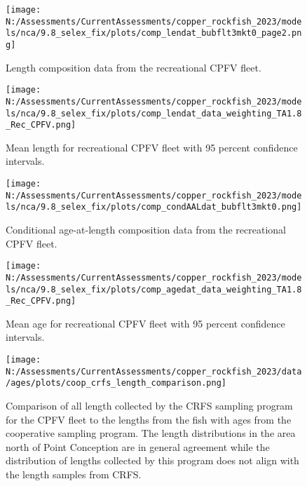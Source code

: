 \documentclass[11pt,
  english,
  letterpaper,
]{article}
\begin{document}
\begin{figure}
\centering
\texttt{[image: N:/Assessments/CurrentAssessments/copper\_rockfish\_2023/models/nca/9.8\_selex\_fix/plots/comp\_lendat\_bubflt3mkt0\_page2.png]}
\caption{Length composition data from the recreational CPFV fleet.\label{fig:rec-cpfv-len-data}}
\end{figure}

\pagebreak

\begin{figure}
\centering
\texttt{[image: N:/Assessments/CurrentAssessments/copper\_rockfish\_2023/models/nca/9.8\_selex\_fix/plots/comp\_lendat\_data\_weighting\_TA1.8\_Rec\_CPFV.png]}
\caption{Mean length for recreational CPFV fleet with 95 percent confidence intervals.\label{fig:mean-rec-cpfv-len-data}}
\end{figure}

\pagebreak

\begin{figure}
\centering
\texttt{[image: N:/Assessments/CurrentAssessments/copper\_rockfish\_2023/models/nca/9.8\_selex\_fix/plots/comp\_condAALdat\_bubflt3mkt0.png]}
\caption{Conditional age-at-length composition data from the recreational CPFV fleet.\label{fig:rec-cpfv-caal-data}}
\end{figure}

\pagebreak

\begin{figure}
\centering
\texttt{[image: N:/Assessments/CurrentAssessments/copper\_rockfish\_2023/models/nca/9.8\_selex\_fix/plots/comp\_agedat\_data\_weighting\_TA1.8\_Rec\_CPFV.png]}
\caption{Mean age for recreational CPFV fleet with 95 percent confidence intervals.\label{fig:mean-rec-cpfv-age-data}}
\end{figure}

\pagebreak

\begin{figure}
\centering
\texttt{[image: N:/Assessments/CurrentAssessments/copper\_rockfish\_2023/data/ages/plots/coop\_crfs\_length\_comparison.png]}
\caption{Comparison of all length collected by the CRFS sampling program for the CPFV fleet to the lengths from the fish with ages from the cooperative sampling program. The length distributions in the area north of Point Conception are in general agreement while the distribution of lengths collected by this program does not align with the length samples from CRFS.\label{fig:coop-len-comparison}}
\end{figure}
\end{document}
